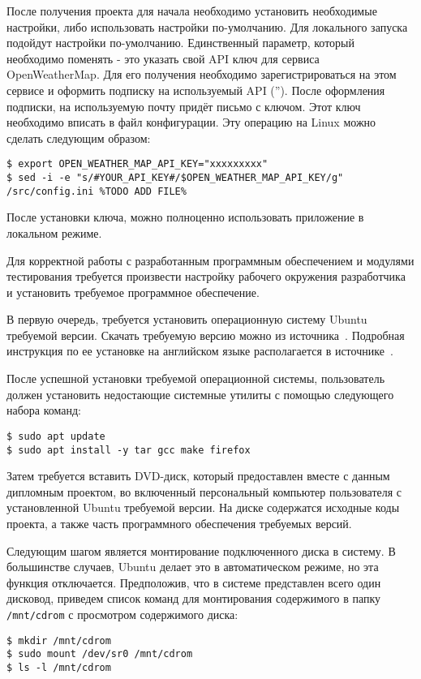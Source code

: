 После получения проекта для начала необходимо установить необходимые настройки, либо использовать настройки по-умолчанию.
Для локального запуска подойдут настройки по-умолчанию.
Единственный параметр, который необходимо поменять - это указать свой API ключ для сервиса OpenWeatherMap.
Для его получения необходимо зарегистрироваться на этом сервисе и оформить подписку на используемый API ('').%
После оформления подписки, на используемую почту придёт письмо с ключом.
Этот ключ необходимо вписать в файл конфигурации.
Эту операцию на Linux можно сделать следующим образом:

\begin{lstlisting}
$ export OPEN_WEATHER_MAP_API_KEY="xxxxxxxxx"   
$ sed -i -e "s/#YOUR_API_KEY#/$OPEN_WEATHER_MAP_API_KEY/g" /src/config.ini %TODO ADD FILE%
\end{lstlisting}

После установки ключа, можно полноценно использовать приложение в локальном режиме.


Для корректной работы с разработанным программным обеспечением и модулями
тестирования требуется произвести настройку рабочего окружения разработчика
и установить требуемое программное обеспечение.

В первую очередь, требуется установить операционную систему Ubuntu требуемой
версии. Скачать требуемую версию можно из источника~\cite{ubuntu_download_site}.
Подробная инструкция по ее установке на английском языке располагается
в источнике~\cite{ubuntu_how_to_install}.

После успешной установки требуемой операционной системы, пользователь должен
установить недостающие системные утилиты с помощью следующего набора команд:
\begin{lstlisting}
$ sudo apt update
$ sudo apt install -y tar gcc make firefox
\end{lstlisting}

Затем требуется вставить
DVD-диск, который предоставлен вместе с данным дипломным проектом, во включенный
персональный компьютер пользователя с установленной Ubuntu требуемой версии.
На диске содержатся исходные коды проекта, а также часть программного обеспечения
требуемых версий.

Следующим шагом является монтирование подключенного диска в систему.
В большинстве случаев, Ubuntu делает это в автоматическом режиме, но эта
функция отключается. Предположив, что в системе представлен всего
один дисковод, приведем список команд для монтирования содержимого
в папку \lstinline{/mnt/cdrom} с просмотром содержимого диска:
\begin{lstlisting}
$ mkdir /mnt/cdrom
$ sudo mount /dev/sr0 /mnt/cdrom
$ ls -l /mnt/cdrom
\end{lstlisting}

